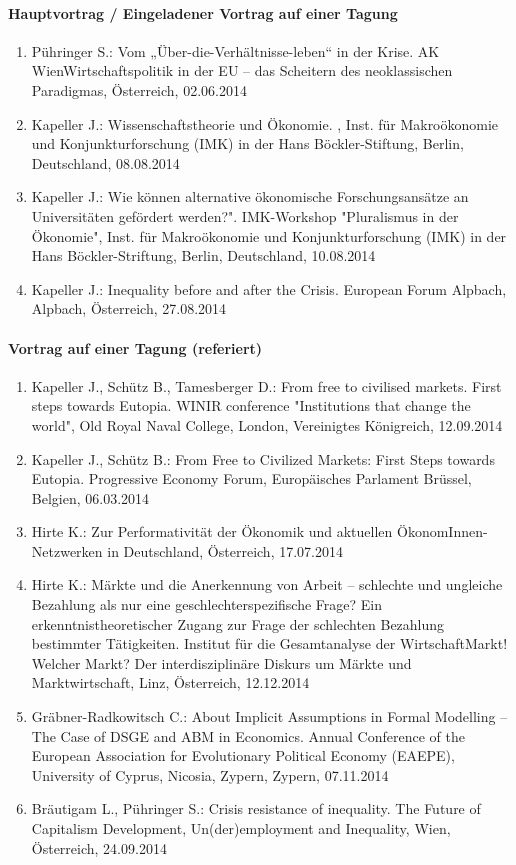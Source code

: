 \paragraph{Hauptvortrag / Eingeladener Vortrag auf einer Tagung}
\begin{enumerate}
	\item Pühringer S.: Vom „Über-die-Verhältnisse-leben“ in der Krise. AK WienWirtschaftspolitik in der EU – das Scheitern des neoklassischen Paradigmas, Österreich, 02.06.2014
	\item Kapeller J.: Wissenschaftstheorie und Ökonomie. , Inst. für Makroökonomie und Konjunkturforschung (IMK) in der Hans Böckler-Stiftung, Berlin, Deutschland, 08.08.2014
	\item Kapeller J.: Wie können alternative ökonomische Forschungsansätze an Universitäten gefördert werden?". IMK-Workshop "Pluralismus in der Ökonomie", Inst. für Makroökonomie und Konjunkturforschung (IMK) in der Hans Böckler-Striftung, Berlin, Deutschland, 10.08.2014
	\item Kapeller J.: Inequality before and after the Crisis. European Forum Alpbach, Alpbach, Österreich, 27.08.2014
\end{enumerate}
\paragraph{Vortrag auf einer Tagung (referiert)}
\begin{enumerate}
	\item Kapeller J., Schütz B., Tamesberger D.: From free to civilised markets. First steps towards Eutopia. WINIR conference "Institutions that change the world", Old Royal Naval College, London, Vereinigtes Königreich, 12.09.2014
	\item Kapeller J., Schütz B.: From Free to Civilized Markets: First Steps towards Eutopia. Progressive Economy Forum, Europäisches Parlament Brüssel, Belgien, 06.03.2014
	\item Hirte K.: Zur Performativität der Ökonomik und aktuellen ÖkonomInnen-Netzwerken in Deutschland, Österreich, 17.07.2014
	\item Hirte K.: Märkte und die Anerkennung von Arbeit – schlechte und ungleiche Bezahlung als nur eine geschlechterspezifische Frage? Ein erkenntnistheoretischer Zugang zur Frage der schlechten Bezahlung bestimmter Tätigkeiten. Institut für die Gesamtanalyse der WirtschaftMarkt! Welcher Markt? Der interdisziplinäre Diskurs um Märkte und Marktwirtschaft, Linz, Österreich, 12.12.2014
	\item Gräbner-Radkowitsch C.: About Implicit Assumptions in Formal Modelling – The Case of DSGE and ABM in Economics. Annual Conference of the European Association for Evolutionary Political Economy (EAEPE), University of Cyprus, Nicosia, Zypern, Zypern, 07.11.2014
	\item Bräutigam L., Pühringer S.: Crisis resistance of inequality. The Future of Capitalism Development, Un(der)employment and Inequality, Wien, Österreich, 24.09.2014
\end{enumerate}
